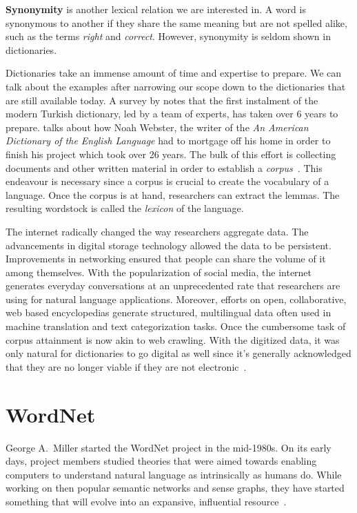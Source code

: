 \textbf{Synonymity} is another lexical relation we are interested in.
A word is synonymous to another if they share the same meaning but are not spelled alike, such as the terms \emph{right} and \emph{correct}.
However, synonymity is seldom shown in dictionaries.

Dictionaries take an immense amount of time and expertise to prepare.
We can talk about the examples after narrowing our scope down to the dictionaries that are still available today.
A survey by \textcite{uzun_1945ten_1999} notes that the first instalment of the modern Turkish dictionary, led by a team of experts, has taken over 6 years to prepare.
\textcite{kendall_forgotten_2011} talks about how Noah Webster, the writer of the \emph{An American Dictionary of the English Language} had to mortgage off his home in order to finish his project which took over 26 years.
The bulk of this effort is collecting documents and other written material in order to establish a \emph{corpus}~\cite{uzun_1945ten_1999}.
This endeavour is necessary since a corpus is crucial to create the vocabulary of a language.
Once the corpus is at hand, researchers can extract the lemmas.
The resulting wordstock is called the \emph{lexicon} of the language.

The internet radically changed the way researchers aggregate data.
The advancements in digital storage technology allowed the data to be persistent.
Improvements in networking ensured that people can share the volume of it among themselves.
With the popularization of social media, the internet generates everyday conversations at an unprecedented rate that researchers are using for natural language applications.
Moreover,  efforts on open, collaborative, web based encyclopedias generate structured, multilingual data often used in machine translation and text categorization tasks.
Once the cumbersome task of corpus attainment is now akin to web crawling.
With the digitized data, it was only natural for dictionaries to go digital as well since it's generally acknowledged that they are no longer viable if they are not electronic~\cite{sterkenburg_practical_2003}.

\section{WordNet}%
\label{sec:wordnet}
George A.\ Miller started the WordNet project in the mid-1980s.
On its early days, project members studied theories that were aimed towards enabling computers to understand natural language as intrinsically as humans do.
While working on then popular semantic networks and sense graphs, they have started something that will evolve into an expansive, influential resource~\cite{fellbaumWordNet1998}.

